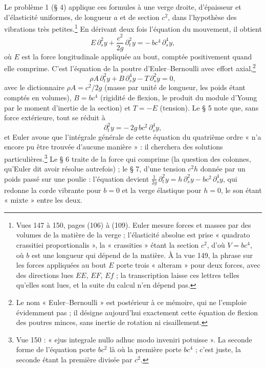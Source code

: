 \documentclass[11pt,a4paper]{article}
\begin{document}
Le problème 1 (§ 4) applique ces formules à une verge droite, d'épaisseur et d'élasticité uniformes, de longueur $a$ et de section $c^2$, dans l'hypothèse des vibrations très petites.\footnote{Vues 147 à 150, pages (106) à (109). Euler mesure forces et masses par des volumes de la matière de la verge ; l'élasticité absolue est prise « quadrato crassitiei proportionalis », la « crassities » étant la section $c^2$, d'où $V=bc^4$, où $b$ est une longueur qui dépend de la matière. À la vue 149, la phrase sur les forces appliquées au bout $E$ porte trois « alteram » pour deux forces, avec des directions lues $EE$, $EF$, $Ef$ ; la transcription laisse ces lettres telles qu'elles sont lues, et la suite du calcul n'en dépend pas.} En dérivant deux fois l'équation du mouvement, il obtient
\[
E\,\partial_s^2 y+\frac{c^2}{2g}\,\partial_t^2 y=-\,bc^4\,\partial_s^4 y,
\]
où $E$ est la force longitudinale appliquée au bout, comptée positivement quand elle comprime. C'est l'équation de la poutre d'Euler--Bernoulli avec effort axial,\footnote{Le nom « Euler--Bernoulli » est postérieur à ce mémoire, qui ne l'emploie évidemment pas ; il désigne aujourd'hui exactement cette équation de flexion des poutres minces, sans inertie de rotation ni cisaillement.}
\[
\rho A\,\partial_t^2 y+B\,\partial_s^4 y-T\,\partial_s^2 y=0,
\]
avec le dictionnaire $\rho A=c^2/2g$ (masse par unité de longueur, les poids étant comptés en volumes), $B=bc^4$ (rigidité de flexion, le produit du module d'Young par le moment d'inertie de la section) et $T=-E$ (tension). Le § 5 note que, sans force extérieure, tout se réduit à
\[
\partial_t^2 y=-\,2g\,bc^2\,\partial_s^4 y,
\]
et Euler avoue que l'intégrale générale de cette équation du quatrième ordre « n'a encore pu être trouvée d'aucune manière » : il cherchera des solutions particulières.\footnote{Vue 150 : « ejus integrale nullo adhuc modo inveniri potuisse ». La seconde forme de l'équation porte $bc^2$ là où la première porte $bc^4$ ; c'est juste, la seconde étant la première divisée par $c^2$.} Le § 6 traite de la force qui comprime (la question des colonnes, qu'Euler dit avoir résolue autrefois) ; le § 7, d'une tension $c^2h$ donnée par un poids passé sur une poulie : l'équation devient $\frac{1}{2g}\,\partial_t^2 y=h\,\partial_s^2 y-bc^2\,\partial_s^4 y$, qui redonne la corde vibrante pour $b=0$ et la verge élastique pour $h=0$, le son étant « mixte » entre les deux.
\end{document}
